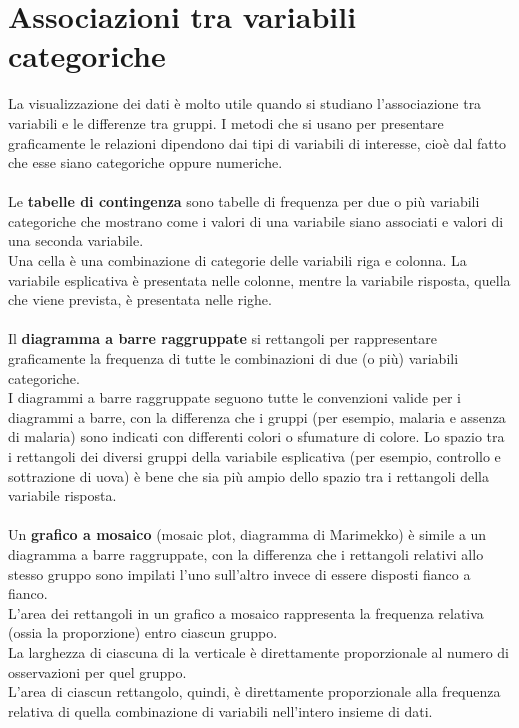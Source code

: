 \documentclass[10pt, draft]{book}
\begin{document}
\section{Associazioni tra variabili categoriche}
La visualizzazione dei dati è molto utile quando si studiano l'associazione tra variabili e le differenze tra gruppi. I metodi che si usano per presentare graficamente le relazioni dipendono dai tipi di variabili di interesse, cioè dal fatto che esse siano categoriche oppure numeriche.
\\
\\
Le \textbf{tabelle di contingenza} sono tabelle di frequenza per due o più variabili categoriche che mostrano come i valori di una variabile siano associati e valori di una seconda variabile. 
\\
Una cella è una combinazione di categorie delle variabili riga e colonna. La variabile esplicativa è presentata nelle colonne, mentre la variabile risposta, quella che viene prevista, è presentata nelle righe. 
\\
\\
Il \textbf{diagramma a barre raggruppate} si rettangoli per rappresentare graficamente la frequenza di tutte le combinazioni di due (o più) variabili categoriche.
\\
I diagrammi a barre raggruppate seguono tutte le convenzioni valide per i diagrammi a barre, con la differenza che i gruppi (per esempio, malaria e assenza di malaria) sono indicati con differenti colori o sfumature di colore.  Lo spazio tra i rettangoli dei diversi gruppi della variabile esplicativa (per esempio, controllo e sottrazione di uova) è bene che sia più ampio dello spazio tra i rettangoli della variabile risposta.
\\
\\
Un \textbf{grafico a mosaico} (mosaic plot, diagramma di Marimekko) è simile a un diagramma a barre raggruppate, con la differenza che i rettangoli relativi allo stesso gruppo sono impilati l'uno sull'altro invece di essere disposti fianco a fianco.
\\
L'area dei rettangoli in un grafico a mosaico rappresenta la frequenza relativa (ossia la proporzione) entro ciascun gruppo.
\\
La larghezza di ciascuna di la verticale è direttamente proporzionale al numero di osservazioni per quel gruppo.
\\
L'area di ciascun rettangolo, quindi, è direttamente proporzionale alla frequenza relativa di quella combinazione di variabili nell'intero insieme di dati.
\end{document}
